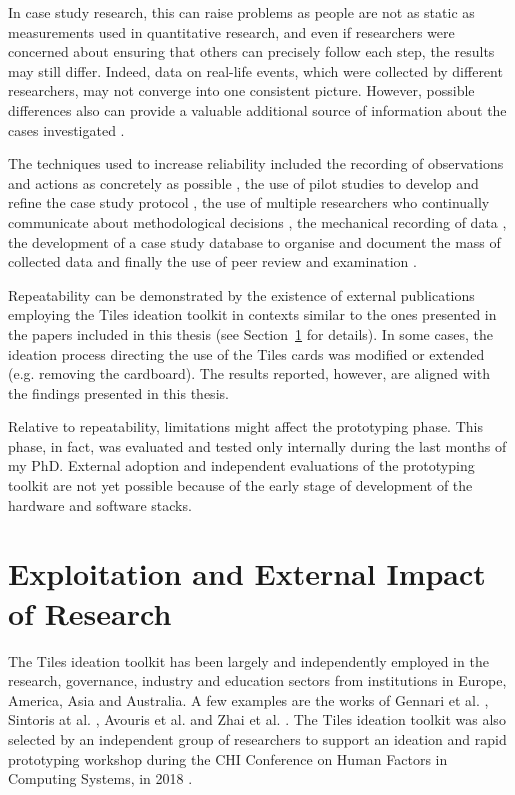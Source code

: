 In case study research, this can raise problems as people are not as static as measurements used in quantitative research, and even if researchers were concerned about ensuring that others can precisely follow each step, the results may still differ. Indeed, data on real-life events, which were collected by different researchers, may not converge into one consistent picture. However, possible differences also can provide a valuable additional source of information about the cases investigated \autocite{riege_validity_2003}.

The techniques used to increase reliability included the recording of observations and actions as concretely as possible \autocite{lecompte_problems_1982}, the use of pilot studies to develop and refine the case study protocol \autocites{eisenhardt_building_1989}{mitchell_industrial_1993}{yin_case_2017}, the use of multiple researchers who continually communicate about methodological decisions \autocite{lecompte_problems_1982}, the mechanical recording of data \autocite{nair_using_1995}, the development of a case study database to organise and document the mass of collected data \autocite{lincoln_naturalistic_1985} and finally the use of peer review and examination \autocite{lecompte_problems_1982}.

Repeatability can be demonstrated by the existence of external publications employing the Tiles ideation toolkit in contexts similar to the ones presented in the papers included in this thesis (see Section~\ref{sec:exploitation} for details). In some cases, the ideation process directing the use of the Tiles cards was modified or extended (e.g. removing the cardboard). The results reported, however, are aligned with the findings presented in this thesis.

Relative to repeatability, limitations might affect the prototyping phase. This phase, in fact, was evaluated and tested only internally during the last months of my PhD. External adoption and independent evaluations of the prototyping toolkit are not yet possible because of the early stage of development of the hardware and software stacks.


\section{Exploitation and External Impact of Research}
\label{sec:exploitation}

The Tiles ideation toolkit has been largely and independently employed in the research, governance, industry and education sectors from institutions in Europe, America, Asia and Australia.
A few examples are the works of 
Gennari et al. \autocite*{gennari_design_2017}, Sintoris at al. \autocite*{sintoris_out_2018}, Avouris et al. \autocite*{avouris_designing_2018} and  Zhai et al. \autocite*{zhai_co-sleep_2018}. The Tiles ideation toolkit was also selected by an independent group of researchers to support an ideation and rapid prototyping workshop during the CHI Conference on Human Factors in Computing Systems, in 2018 \autocite{angelini_internet_2018-1}.

